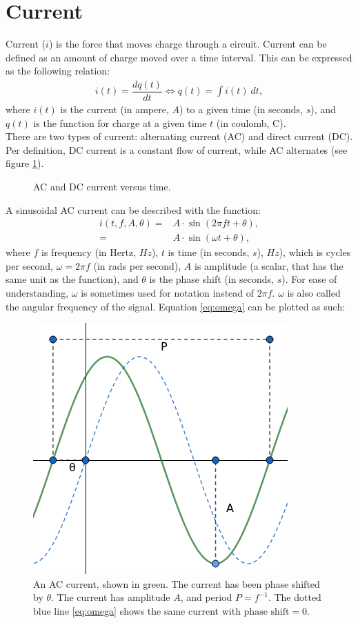 \section{Current}
Current ($i$) is the force that moves charge through a circuit. Current can be defined as an amount of charge moved over a time interval. This can be expressed as the following relation:
\begin{align}
i(t)=\dfrac{dq(t)}{dt} \Leftrightarrow q(t)=\int i(t)\ dt,
\label{I=dq/dt}
\end{align}
where $i(t)$ is the current (in ampere, $A$) to a given time (in seconds, $s$), and $q(t)$ is the function for charge at a given time $t$ (in coulomb, C). 
\\
There are two types of current: alternating current (AC) and direct current (DC). Per definition, DC current is a constant flow of current, while AC alternates (see figure \ref{fig:ACDC}). 
\begin{figure}[H] 

\caption{AC and DC current versus time.}
\label{fig:ACDC}
\end{figure}
\noindent
A sinusoidal AC current can be described with the function: 
\begin{align}
i\left(t, f, A, \theta\right) =& A\cdot \sin{\left(2\pi ft + \theta\right)}, \nonumber
\\
=& A \cdot \sin{\left(\omega t + \theta\right)}, \label{eq:omega}
\end{align}
where $f$ is frequency (in Hertz, $Hz$), $t$ is time (in seconds, $s$), $Hz$), which is cycles per second, $\omega = 2\pi f$ (in rads per second), $A$ is amplitude (a scalar, that has the same unit as the function), and $\theta$ is the phase shift (in seconds, $s$).
For ease of understanding, $\omega$ is sometimes used for notation instead of $2\pi f$. $\omega$ is also called the angular frequency of the signal.
Equation \ref{eq:omega} can be plotted as such:
\begin{figure}[H]
	\centering
	\includegraphics[scale=0.7]{fig/img/AC.png}
	\caption{An AC current, shown in green. The current has been phase shifted by $\theta$. The current has amplitude $A$, and period $P=f^{-1}$. The dotted blue line \ref{eq:omega} shows the same current with $\text{phase shift} =0$.}
\end{figure}


